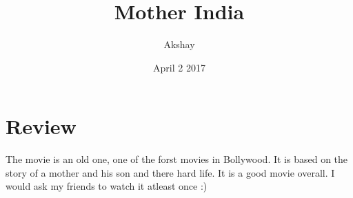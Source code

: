 \documentclass{article}
\title{Mother India}
\author{Akshay}
\date{April 2 2017}
\begin{document}
\maketitle
\section{Review}
The movie is an old one, one of the forst movies in Bollywood. It is based on the story of a mother and his son and there hard life. It is a good movie overall.
I would ask my friends to watch it atleast once :)
\end{document}
